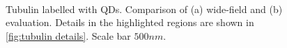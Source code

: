 %
%
%
%

%

\begin{figure}[!p]
	\newcommand{\wf}{.47\textwidth}
	\centering
	\\
	\caption{Tubulin labelled with QDs. Comparison of (a) wide-field and (b) \inmf{} evaluation. Details in the highlighted regions are shown in \autoref{fig:tubulin details}. Scale bar $500 \unit{nm}$.}
	\label{fig:tubulin WF and NMF}
\end{figure}

